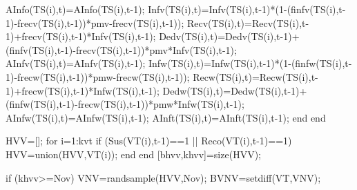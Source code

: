                                             AInfo(TS(i),t)=AInfo(TS(i),t-1);
                                            Infv(TS(i),t)=Infv(TS(i),t-1)*(1-(finfv(TS(i),t-1)-frecv(TS(i),t-1))*pmv-frecv(TS(i),t-1));
                                            Recv(TS(i),t)=Recv(TS(i),t-1)+frecv(TS(i),t-1)*Infv(TS(i),t-1);
                                            Dedv(TS(i),t)=Dedv(TS(i),t-1)+(finfv(TS(i),t-1)-frecv(TS(i),t-1))*pmv*Infv(TS(i),t-1);
                                            AInfv(TS(i),t)=AInfv(TS(i),t-1); 
                                            Infw(TS(i),t)=Infw(TS(i),t-1)*(1-(finfw(TS(i),t-1)-frecw(TS(i),t-1))*pmw-frecw(TS(i),t-1));
                                            Recw(TS(i),t)=Recw(TS(i),t-1)+frecw(TS(i),t-1)*Infw(TS(i),t-1);
                                            Dedw(TS(i),t)=Dedw(TS(i),t-1)+(finfw(TS(i),t-1)-frecw(TS(i),t-1))*pmw*Infw(TS(i),t-1);
                                            AInfw(TS(i),t)=AInfw(TS(i),t-1);  
                                            AInft(TS(i),t)=AInft(TS(i),t-1);                     
                                      end
                                  end                                    
                               
                               HVV=[];
                               for i=1:kvt
                                    if (Sus(VT(i),t-1)==1 || Reco(VT(i),t-1)==1)
                                          HVV=union(HVV,VT(i));                                    
                                    end
                               end
                               [bhvv,khvv]=size(HVV);
                               
                               if (khvv>=Nov) 
                                    VNV=randsample(HVV,Nov); %
                                    BVNV=setdiff(VT,VNV);
                                                                        
